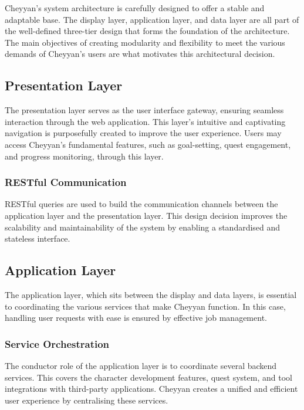 \documentclass{l4proj}
\begin{document}
Cheyyan's system architecture is carefully designed to offer a stable and adaptable base. The display layer, application layer, and data layer are all part of the well-defined three-tier design that forms the foundation of the architecture. The main objectives of creating modularity and flexibility to meet the various demands of Cheyyan's users are what motivates this architectural decision.

\subsection{Presentation Layer}

The presentation layer serves as the user interface gateway, ensuring seamless interaction through the web application. This layer's intuitive and captivating navigation is purposefully created to improve the user experience. Users may access Cheyyan's fundamental features, such as goal-setting, quest engagement, and progress monitoring, through this layer.


\subsubsection{RESTful Communication}

RESTful queries are used to build the communication channels between the application layer and the presentation layer. This design decision improves the scalability and maintainability of the system by enabling a standardised and stateless interface.


\subsection{Application Layer}

The application layer, which sits between the display and data layers, is essential to coordinating the various services that make Cheyyan function. In this case, handling user requests with ease is ensured by effective job management.


\subsubsection{Service Orchestration}

The conductor role of the application layer is to coordinate several backend services. This covers the character development features, quest system, and tool integrations with third-party applications. Cheyyan creates a unified and efficient user experience by centralising these services.
\end{document}
